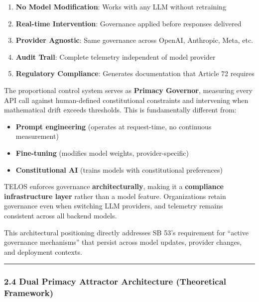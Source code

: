 \begin{enumerate}
\def\labelenumi{\arabic{enumi}.}
\tightlist
\item
  \textbf{No Model Modification}: Works with any LLM without retraining
\item
  \textbf{Real-time Intervention}: Governance applied before responses
  delivered
\item
  \textbf{Provider Agnostic}: Same governance across OpenAI, Anthropic,
  Meta, etc.
\item
  \textbf{Audit Trail}: Complete telemetry independent of model provider
\item
  \textbf{Regulatory Compliance}: Generates documentation that Article
  72 requires
\end{enumerate}

The proportional control system serves as \textbf{Primacy Governor},
measuring every API call against human-defined constitutional
constraints and intervening when mathematical drift exceeds thresholds.
This is fundamentally different from:

\begin{itemize}
\tightlist
\item
  \textbf{Prompt engineering} (operates at request-time, no continuous
  measurement)
\item
  \textbf{Fine-tuning} (modifies model weights, provider-specific)
\item
  \textbf{Constitutional AI} (trains models with constitutional
  preferences)
\end{itemize}

TELOS enforces governance \textbf{architecturally}, making it a
\textbf{compliance infrastructure layer} rather than a model feature.
Organizations retain governance even when switching LLM providers, and
telemetry remains consistent across all backend models.

This architectural positioning directly addresses SB 53's requirement
for ``active governance mechanisms'' that persist across model updates,
provider changes, and deployment contexts.

\begin{center}\rule{0.5\linewidth}{0.5pt}\end{center}

\subsubsection{2.4 Dual Primacy Attractor Architecture (Theoretical
Framework)}\label{dual-primacy-attractor-architecture-theoretical-framework}

